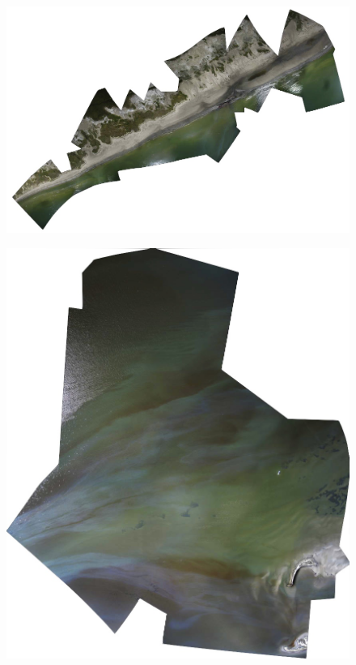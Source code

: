 \documentclass[11pt,oneside,notitlepage]{report}
\begin{document}
\begin{figure}[p]
  \begin{center}
	\includegraphics[width=1\textwidth]{images/grand-isle-terre.jpg}
	\caption{}
  \end{center}
\end{figure}

\begin{figure}[p]
  \begin{center}
	\includegraphics[width=1\textwidth]{images/chandeleur-island.jpg}
	\caption{}
  \end{center}
\end{figure}
\end{document}
